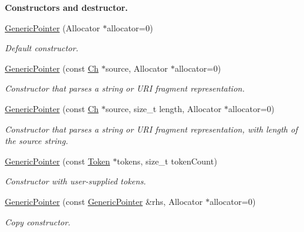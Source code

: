 \begin{Indent}\textbf{ Constructors and destructor.}\par
\begin{DoxyCompactItemize}
\item 
\mbox{\label{classGenericPointer_a5d85b7dc82719643e8f7adccd5a74fbe}} 
\hyperlink{classGenericPointer_a5d85b7dc82719643e8f7adccd5a74fbe}{Generic\+Pointer} (Allocator $\ast$allocator=0)
\begin{DoxyCompactList}\small\item\em Default constructor. \end{DoxyCompactList}\item 
\hyperlink{classGenericPointer_a4ad549b8a826c3c2dedf03fcc07be9b0}{Generic\+Pointer} (const \hyperlink{classGenericPointer_ab292356c11b4015c98d21b966b11f285}{Ch} $\ast$source, Allocator $\ast$allocator=0)
\begin{DoxyCompactList}\small\item\em Constructor that parses a string or U\+RI fragment representation. \end{DoxyCompactList}\item 
\hyperlink{classGenericPointer_a9c05684ea95306aac7626e70cb3946cc}{Generic\+Pointer} (const \hyperlink{classGenericPointer_ab292356c11b4015c98d21b966b11f285}{Ch} $\ast$source, size\+\_\+t length, Allocator $\ast$allocator=0)
\begin{DoxyCompactList}\small\item\em Constructor that parses a string or U\+RI fragment representation, with length of the source string. \end{DoxyCompactList}\item 
\hyperlink{classGenericPointer_a524a9921eff68f389a817a20ca7f1d84}{Generic\+Pointer} (const \hyperlink{structGenericPointer_1_1Token}{Token} $\ast$tokens, size\+\_\+t token\+Count)
\begin{DoxyCompactList}\small\item\em Constructor with user-\/supplied tokens. \end{DoxyCompactList}\item 
\mbox{\label{classGenericPointer_a18d671bb793c6b843d5496b2b130cb70}} 
\hyperlink{classGenericPointer_a18d671bb793c6b843d5496b2b130cb70}{Generic\+Pointer} (const \hyperlink{classGenericPointer}{Generic\+Pointer} \&rhs, Allocator $\ast$allocator=0)
\begin{DoxyCompactList}\small\item\em Copy constructor. \end{DoxyCompactList}\item 

\end{DoxyCompactItemize}
\end{Indent}
